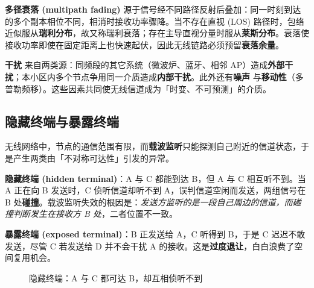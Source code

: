 \textbf{多径衰落 (multipath fading)} 源于信号经不同路径反射后叠加：同一时刻到达的多个副本相位不同，相消时接收功率骤降。当不存在直视 (LOS) 路径时，包络近似服从\textbf{瑞利分布}，故又称瑞利衰落；存在主导直视分量时服从\textbf{莱斯分布}。衰落使接收功率即使在固定距离上也快速起伏，因此无线链路必须预留\textbf{衰落余量}。

\textbf{干扰} 来自两类源：同频段的其它系统（微波炉、蓝牙、相邻 AP）造成\textbf{外部干扰}；本小区内多个节点争用同一介质造成\textbf{内部干扰}。此外还有\textbf{噪声} 与\textbf{移动性}（多普勒频移）。这些因素共同使无线信道成为「时变、不可预测」的介质。

\subsection{隐藏终端与暴露终端}

无线网络中，节点的通信范围有限，而\textbf{载波监听}只能探测自己附近的信道状态，于是产生两类由「不对称可达性」引发的异常。

\textbf{隐藏终端 (hidden terminal)}：A 与 C 都能到达 B，但 A 与 C 相互听不到。当 A 正在向 B 发送时，C 侦听信道却听不到 A，误判信道空闲而发送，两组信号在 B 处\textbf{碰撞}。载波监听失效的根因是：\emph{发送方监听的是一段自己周边的信道，而碰撞判断发生在接收方 B 处}，二者位置不一致。

\textbf{暴露终端 (exposed terminal)}：B 正发送给 A，C 听得到 B，于是 C 迟迟不敢发送，尽管 C 若发送给 D 并不会干扰 A 的接收。这是\textbf{过度退让}，白白浪费了空间复用机会。

\begin{figure}[H]
\centering
{}
\caption{隐藏终端：A 与 C 都可达 B，却互相侦听不到}
\label{fig:hidden_terminal}
\end{figure}

